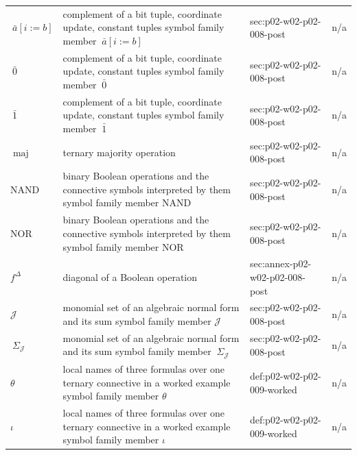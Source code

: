 \begin{longtable}{@{}p{}p{}p{}p{}@{}}
\(\ \bar a[i{:=}b]\) & complement of a bit tuple, coordinate update, constant tuples symbol family member \(\ \bar a[i{:=}b]\) & sec:\allowbreak{}p02-\allowbreak{}w02-\allowbreak{}p02-\allowbreak{}008-\allowbreak{}post & n/a \\
\(\ \bar0\) & complement of a bit tuple, coordinate update, constant tuples symbol family member \(\ \bar0\) & sec:\allowbreak{}p02-\allowbreak{}w02-\allowbreak{}p02-\allowbreak{}008-\allowbreak{}post & n/a \\
\(\ \bar1\) & complement of a bit tuple, coordinate update, constant tuples symbol family member \(\ \bar1\) & sec:\allowbreak{}p02-\allowbreak{}w02-\allowbreak{}p02-\allowbreak{}008-\allowbreak{}post & n/a \\
\(\operatorname{maj}\) & ternary majority operation & sec:\allowbreak{}p02-\allowbreak{}w02-\allowbreak{}p02-\allowbreak{}008-\allowbreak{}post & n/a \\
\(\mathrm{NAND}\) & binary Boolean operations and the connective symbols interpreted by them symbol family member \(\mathrm{NAND}\) & sec:\allowbreak{}p02-\allowbreak{}w02-\allowbreak{}p02-\allowbreak{}008-\allowbreak{}post & n/a \\
\(\mathrm{NOR}\) & binary Boolean operations and the connective symbols interpreted by them symbol family member \(\mathrm{NOR}\) & sec:\allowbreak{}p02-\allowbreak{}w02-\allowbreak{}p02-\allowbreak{}008-\allowbreak{}post & n/a \\
\(f^\Delta\) & diagonal of a Boolean operation & sec:\allowbreak{}annex-\allowbreak{}p02-\allowbreak{}w02-\allowbreak{}p02-\allowbreak{}008-\allowbreak{}post & n/a \\
\(\mathcal J\) & monomial set of an algebraic normal form and its sum symbol family member \(\mathcal J\) & sec:\allowbreak{}p02-\allowbreak{}w02-\allowbreak{}p02-\allowbreak{}008-\allowbreak{}post & n/a \\
\(\ \Sigma_{\mathcal J}\) & monomial set of an algebraic normal form and its sum symbol family member \(\ \Sigma_{\mathcal J}\) & sec:\allowbreak{}p02-\allowbreak{}w02-\allowbreak{}p02-\allowbreak{}008-\allowbreak{}post & n/a \\
\(\theta\) & local names of three formulas over one ternary connective in a worked example symbol family member \(\theta\) & def:\allowbreak{}p02-\allowbreak{}w02-\allowbreak{}p02-\allowbreak{}009-\allowbreak{}worked & n/a \\
\(\iota\) & local names of three formulas over one ternary connective in a worked example symbol family member \(\iota\) & def:\allowbreak{}p02-\allowbreak{}w02-\allowbreak{}p02-\allowbreak{}009-\allowbreak{}worked & n/a \\

\end{longtable}

